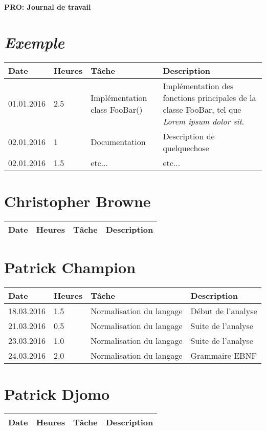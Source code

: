 \documentclass[french]{article}
\begin{document}
	\centering
	\large{\textbf{PRO: Journal de travail}}
	
	\justify
	
	\section*{\huge \textit{Exemple}}
	\begin{tabular}{p{}|p{}|p{}|p{}}
		Date&Heures&Tâche&Description\\
		\hline
		01.01.2016&2.5&Implémentation class FooBar()&Implémentation des fonctions principales de la classe FooBar, tel que \textit{Lorem ipsum dolor sit}.\\
		\hline
		02.01.2016&1&Documentation&Description de quelquechose\\
		\hline
		02.01.2016&1.5&etc...&etc...
	\end{tabular}
	
	\section*{Christopher Browne}
	\begin{tabular}{p{}|p{}|p{}|p{}}
		Date&Heures&Tâche&Description\\
		\hline
	\end{tabular}
	
	\section*{Patrick Champion}
	\begin{tabular}{p{}|p{}|p{}|p{}}
		Date & Heures & Tâche & Description\\ \hline \hline
		18.03.2016 & 1.5 & Normalisation du langage & Début de l'analyse\\
		21.03.2016 & 0.5 & Normalisation du langage & Suite de l'analyse\\
		23.03.2016 & 1.0 & Normalisation du langage & Suite de l'analyse\\
		24.03.2016 & 2.0 & Normalisation du langage & Grammaire EBNF\\
	\end{tabular}
		
	\section*{Patrick Djomo}
	\begin{tabular}{p{}|p{}|p{}|p{}}
		Date&Heures&Tâche&Description\\
		\hline
	\end{tabular}
		
\end{document}
